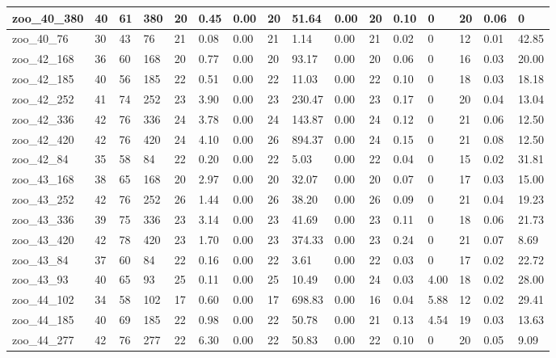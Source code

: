 \begin{landscape}
\begin{longtable}{llllllllllllllll}
zoo\_40\_380 & 40 & 61 & 380 & 20 & 0.45 & 0.00 & 20 & 51.64 & 0.00 & 20 & 0.10 & 0 & 20 & 0.06 & 0 \\ \hline 
zoo\_40\_76 & 30 & 43 & 76 & 21 & 0.08 & 0.00 & 21 & 1.14 & 0.00 & 21 & 0.02 & 0 & 12 & 0.01 & 42.85 \\ \hline 
zoo\_42\_168 & 36 & 60 & 168 & 20 & 0.77 & 0.00 & 20 & 93.17 & 0.00 & 20 & 0.06 & 0 & 16 & 0.03 & 20.00 \\ \hline 
zoo\_42\_185 & 40 & 56 & 185 & 22 & 0.51 & 0.00 & 22 & 11.03 & 0.00 & 22 & 0.10 & 0 & 18 & 0.03 & 18.18 \\ \hline 
zoo\_42\_252 & 41 & 74 & 252 & 23 & 3.90 & 0.00 & 23 & 230.47 & 0.00 & 23 & 0.17 & 0 & 20 & 0.04 & 13.04 \\ \hline 
zoo\_42\_336 & 42 & 76 & 336 & 24 & 3.78 & 0.00 & 24 & 143.87 & 0.00 & 24 & 0.12 & 0 & 21 & 0.06 & 12.50 \\ \hline 
zoo\_42\_420 & 42 & 76 & 420 & 24 & 4.10 & 0.00 & 26 & 894.37 & 0.00 & 24 & 0.15 & 0 & 21 & 0.08 & 12.50 \\ \hline 
zoo\_42\_84 & 35 & 58 & 84 & 22 & 0.20 & 0.00 & 22 & 5.03 & 0.00 & 22 & 0.04 & 0 & 15 & 0.02 & 31.81 \\ \hline 
zoo\_43\_168 & 38 & 65 & 168 & 20 & 2.97 & 0.00 & 20 & 32.07 & 0.00 & 20 & 0.07 & 0 & 17 & 0.03 & 15.00 \\ \hline 
zoo\_43\_252 & 42 & 76 & 252 & 26 & 1.44 & 0.00 & 26 & 38.20 & 0.00 & 26 & 0.09 & 0 & 21 & 0.04 & 19.23 \\ \hline 
zoo\_43\_336 & 39 & 75 & 336 & 23 & 3.14 & 0.00 & 23 & 41.69 & 0.00 & 23 & 0.11 & 0 & 18 & 0.06 & 21.73 \\ \hline 
zoo\_43\_420 & 42 & 78 & 420 & 23 & 1.70 & 0.00 & 23 & 374.33 & 0.00 & 23 & 0.24 & 0 & 21 & 0.07 & 8.69 \\ \hline 
zoo\_43\_84 & 37 & 60 & 84 & 22 & 0.16 & 0.00 & 22 & 3.61 & 0.00 & 22 & 0.03 & 0 & 17 & 0.02 & 22.72 \\ \hline 
zoo\_43\_93 & 40 & 65 & 93 & 25 & 0.11 & 0.00 & 25 & 10.49 & 0.00 & 24 & 0.03 & 4.00 & 18 & 0.02 & 28.00 \\ \hline 
zoo\_44\_102 & 34 & 58 & 102 & 17 & 0.60 & 0.00 & 17 & 698.83 & 0.00 & 16 & 0.04 & 5.88 & 12 & 0.02 & 29.41 \\ \hline 
zoo\_44\_185 & 40 & 69 & 185 & 22 & 0.98 & 0.00 & 22 & 50.78 & 0.00 & 21 & 0.13 & 4.54 & 19 & 0.03 & 13.63 \\ \hline 
zoo\_44\_277 & 42 & 76 & 277 & 22 & 6.30 & 0.00 & 22 & 50.83 & 0.00 & 22 & 0.10 & 0 & 20 & 0.05 & 9.09 \\ \hline 

\end{longtable}
\end{landscape}
